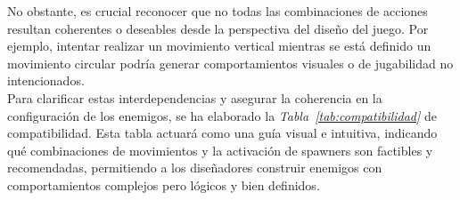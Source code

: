 No obstante, es crucial reconocer que no todas las combinaciones de acciones resultan coherentes o deseables desde la perspectiva del diseño del juego. Por ejemplo, intentar realizar un movimiento vertical mientras se está definido un movimiento circular podría generar comportamientos visuales o de jugabilidad no intencionados. \\

Para clarificar estas interdependencias y asegurar la coherencia en la configuración de los enemigos, se ha elaborado la \textit{Tabla~\ref{tab:compatibilidad}} de compatibilidad. Esta tabla actuará como una guía visual e intuitiva, indicando qué combinaciones de movimientos y la activación de spawners son factibles y recomendadas, permitiendo a los diseñadores construir enemigos con comportamientos complejos pero lógicos y bien definidos.

